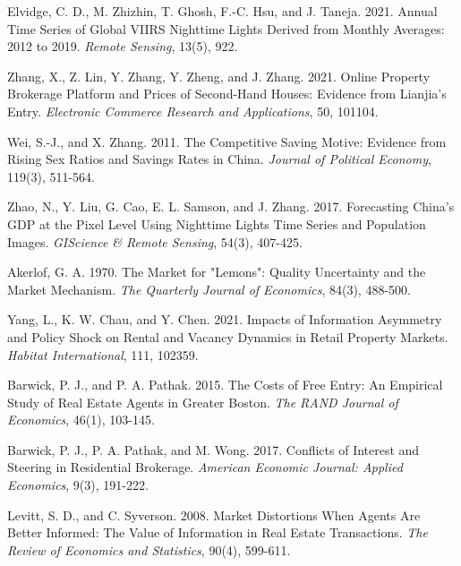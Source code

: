 \documentclass[11pt]{article}
\begin{document}
\begin{singlespace}
\begin{thebibliography}{}
  Elvidge, C. D., M. Zhizhin, T. Ghosh, F.-C. Hsu, and J. Taneja. 2021. Annual Time Series of Global VIIRS Nighttime Lights Derived from Monthly Averages: 2012 to 2019. \textit{Remote Sensing}, 13(5), 922.
  
  Zhang, X., Z. Lin, Y. Zhang, Y. Zheng, and J. Zhang. 2021. Online Property Brokerage Platform and Prices of Second-Hand Houses: Evidence from Lianjia's Entry. \textit{Electronic Commerce Research and Applications}, 50, 101104.
  
  Wei, S.-J., and X. Zhang. 2011. The Competitive Saving Motive: Evidence from Rising Sex Ratios and Savings Rates in China. \textit{Journal of Political Economy}, 119(3), 511-564.
  
  Zhao, N., Y. Liu, G. Cao, E. L. Samson, and J. Zhang. 2017. Forecasting China's GDP at the Pixel Level Using Nighttime Lights Time Series and Population Images. \textit{GIScience \& Remote Sensing}, 54(3), 407-425.
  
  Akerlof, G. A. 1970. The Market for "Lemons": Quality Uncertainty and the Market Mechanism. \textit{The Quarterly Journal of Economics}, 84(3), 488-500.
  
  Yang, L., K. W. Chau, and Y. Chen. 2021. Impacts of Information Asymmetry and Policy Shock on Rental and Vacancy Dynamics in Retail Property Markets. \textit{Habitat International}, 111, 102359.
  
  Barwick, P. J., and P. A. Pathak. 2015. The Costs of Free Entry: An Empirical Study of Real Estate Agents in Greater Boston. \textit{The RAND Journal of Economics}, 46(1), 103-145.
  
  Barwick, P. J., P. A. Pathak, and M. Wong. 2017. Conflicts of Interest and Steering in Residential Brokerage. \textit{American Economic Journal: Applied Economics}, 9(3), 191-222.
  
  Levitt, S. D., and C. Syverson. 2008. Market Distortions When Agents Are Better Informed: The Value of Information in Real Estate Transactions. \textit{The Review of Economics and Statistics}, 90(4), 599-611.
  

\end{thebibliography}
\end{singlespace}
\end{document}

